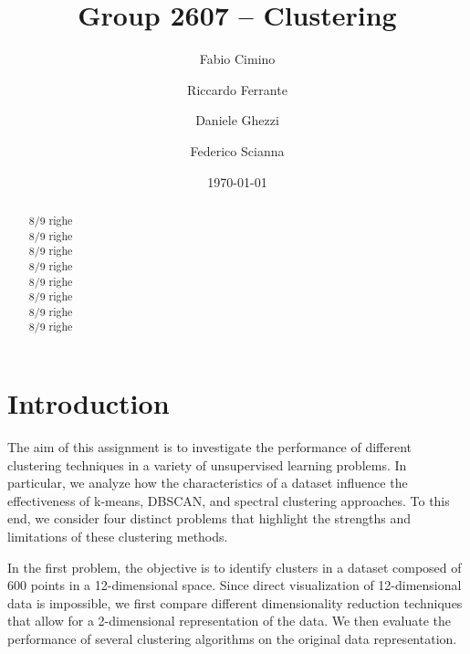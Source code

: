 \documentclass[prl,twocolumn]{revtex4-1}
\begin{document}
\title{Group 2607 -- Clustering}





\author{Fabio Cimino}
\author{Riccardo Ferrante}
\author{Daniele Ghezzi}
\author{Federico Scianna}

\date{\today}


\begin{abstract}
8/9 righe\\
8/9 righe\\
8/9 righe\\
8/9 righe\\
8/9 righe\\
8/9 righe\\
8/9 righe\\
8/9 righe\\
\end{abstract}

\maketitle

\section{Introduction}
The aim of this assignment is to investigate the performance of different clustering techniques in a variety of unsupervised learning problems.
In particular, we analyze how the characteristics of a dataset influence the effectiveness of k-means, DBSCAN, and spectral clustering approaches.
To this end, we consider four distinct problems that highlight the strengths and limitations of these clustering methods.



In the first problem, the objective is to identify clusters in a dataset composed of 600 points in a 12-dimensional space.
Since direct visualization of 12-dimensional data is impossible, we first compare different dimensionality reduction techniques that allow for a 2-dimensional representation of the data.
We then evaluate the performance of several clustering algorithms on the original data representation.
\end{document}
